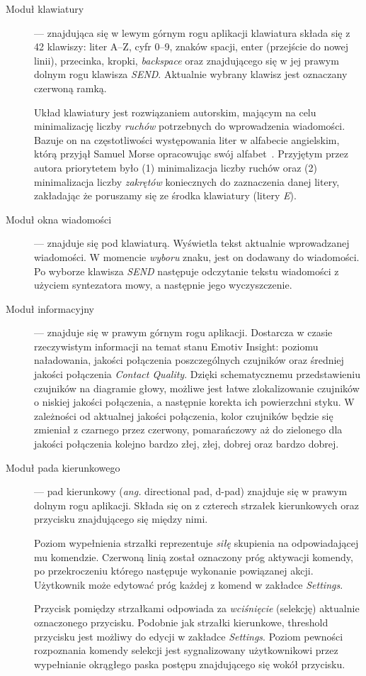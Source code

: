 \documentclass[skorowidz,skroty]{dyplomWEZUT}
\begin{document}
\begin{description}
    \item [Moduł klawiatury] --- znajdująca się w lewym górnym rogu aplikacji klawiatura składa się z 42 klawiszy: liter A--Z, cyfr 0--9, znaków spacji, enter (przejście do nowej linii), przecinka, kropki, \textit{backspace} oraz znajdującego się w jej prawym dolnym rogu klawisza \textit{SEND}. Aktualnie wybrany klawisz jest oznaczany czerwoną ramką.
    
    Układ klawiatury jest rozwiązaniem autorskim, mającym na celu minimalizację liczby \textit{ruchów} potrzebnych do wprowadzenia wiadomości. Bazuje on na częstotliwości występowania liter w alfabecie angielskim, którą przyjął Samuel Morse opracowując swój alfabet~\cite{morse}. Przyjętym przez autora priorytetem było (1) minimalizacja liczby ruchów oraz (2) minimalizacja liczby \textit{zakrętów} koniecznych do zaznaczenia danej litery, zakładając że poruszamy się ze środka klawiatury (litery \textit{E}).

    \item [Moduł okna wiadomości] --- znajduje się pod klawiaturą. Wyświetla tekst aktualnie wprowadzanej wiadomości. W momencie \textit{wyboru} znaku, jest on dodawany do wiadomości. Po wyborze klawisza \textit{SEND} następuje odczytanie tekstu wiadomości z użyciem syntezatora mowy, a następnie jego wyczyszczenie.
    
    \item [Moduł informacyjny] --- znajduje się w prawym górnym rogu aplikacji. Dostarcza w czasie rzeczywistym informacji na temat stanu Emotiv Insight: poziomu naładowania, jakości połączenia poszczególnych czujników oraz średniej jakości połączenia \textit{Contact Quality}. Dzięki schematycznemu przedstawieniu czujników na diagramie głowy, możliwe jest łatwe zlokalizowanie czujników o niskiej jakości połączenia, a następnie korekta ich powierzchni styku. W zależności od aktualnej jakości połączenia, kolor czujników będzie się zmieniał z czarnego przez czerwony, pomarańczowy aż do zielonego dla jakości połączenia kolejno bardzo złej, złej, dobrej oraz bardzo dobrej.
    
    \item [Moduł pada kierunkowego] --- pad kierunkowy (\textit{ang.} directional pad, d-pad) znajduje się w prawym dolnym rogu aplikacji. Składa się on z czterech strzałek kierunkowych oraz przycisku znajdującego się między nimi. 
    
    Poziom wypełnienia strzałki reprezentuje \textit{siłę} skupienia na odpowiadającej mu komendzie. Czerwoną linią został oznaczony próg aktywacji komendy, po przekroczeniu którego następuje wykonanie powiązanej akcji. Użytkownik może edytować próg każdej z komend w zakładce \textit{Settings}. 

    Przycisk pomiędzy strzałkami odpowiada za \textit{wciśnięcie} (selekcję) aktualnie oznaczonego przycisku. Podobnie jak strzałki kierunkowe, threshold przycisku jest możliwy do edycji w zakładce \textit{Settings}. Poziom pewności rozpoznania komendy selekcji jest sygnalizowany użytkownikowi przez wypełnianie okrągłego paska postępu znajdującego się wokół przycisku.
\end{description}
\end{document}
